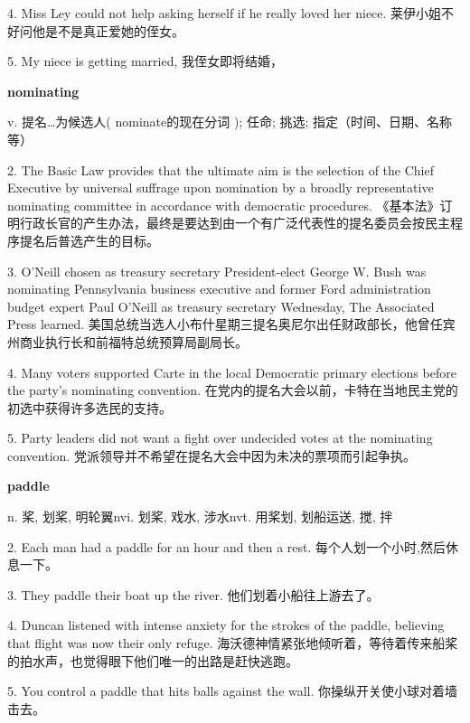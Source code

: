 \documentclass[12pt]{book}
\begin{document}
4.  Miss Ley could not help asking herself if he really loved her niece.  莱伊小姐不好问他是不是真正爱她的侄女。 


5.  My niece is getting married,  我侄女即将结婚， 


\vspace{12pt}

\textbf{nominating}

v. 提名…为候选人( nominate的现在分词 ); 任命; 挑选; 指定（时间、日期、名称等）

2.  The Basic Law provides that the ultimate aim is the selection of the Chief Executive by universal suffrage upon nomination by a broadly representative nominating committee in accordance with democratic procedures.  《基本法》订明行政长官的产生办法，最终是要达到由一个有广泛代表性的提名委员会按民主程序提名后普选产生的目标。 


3.  O'Neill chosen as treasury secretary President-elect George W. Bush was nominating Pennsylvania business executive and former Ford administration budget expert Paul O'Neill as treasury secretary Wednesday, The Associated Press learned.  美国总统当选人小布什星期三提名奥尼尔出任财政部长，他曾任宾州商业执行长和前福特总统预算局副局长。 


4.  Many voters supported Carte in the local Democratic primary elections before the party's nominating convention.  在党内的提名大会以前，卡特在当地民主党的初选中获得许多选民的支持。 


5.  Party leaders did not want a fight over undecided votes at the nominating convention.  党派领导并不希望在提名大会中因为未决的票项而引起争执。 


\vspace{12pt}

\textbf{paddle}

n. 桨, 划桨, 明轮翼nvi. 划桨, 戏水, 涉水nvt. 用桨划, 划船运送, 搅, 拌

2.  Each man had a paddle for an hour and then a rest.  每个人划一个小时,然后休息一下。 


3.  They paddle their boat up the river.  他们划着小船往上游去了。 


4.  Duncan listened with intense anxiety for the strokes of the paddle, believing that flight was now their only refuge.  海沃德神情紧张地倾听着，等待着传来船桨的拍水声，也觉得眼下他们唯一的出路是赶快逃跑。 


5.  You control a paddle that hits balls against the wall.  你操纵开关使小球对着墙击去。 


\vspace{12pt}
\end{document}

